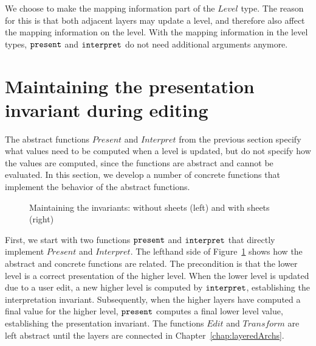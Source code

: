 

We choose to make the mapping information part of the $Level$ type. The reason for this is that both adjacent layers may update a level, and therefore also affect the mapping information on the level.  With the mapping information in the level types, ${\tt present}$ and ${\tt interpret}$ do not need additional arguments anymore.
\ec



%																
%																
%																
\section{Maintaining the presentation invariant during editing}   \label{sect:maintainingInv}

The abstract functions $Present$ and $Interpret$ from the previous section specify what values need to be computed when a level is updated, but do not specify how the values are computed, since the functions are abstract and cannot be evaluated. In this section, we develop a number of concrete  functions that implement the behavior of the abstract functions.

\begin{figure}
\begin{center}
\begin{center}
 
\end{center}
\caption{Maintaining the invariants: without sheets (left) and with sheets (right)}\label{maintainingInvs} 
\end{center}
\end{figure}

First, we start with two functions ${\tt present}$ and ${\tt interpret}$ that directly implement $Present$ and $Interpret$. The lefthand side of Figure~\ref{maintainingInvs} shows how the abstract and concrete functions are related. The precondition is that the lower level is a correct presentation of the higher level. When the lower level is updated due to a user edit, a new higher level is computed by ${\tt interpret}$, establishing the interpretation invariant. Subsequently, when the higher layers have computed a final value for the higher level, ${\tt present}$ computes a final lower level value, establishing the presentation invariant. The functions $Edit$ and $Transform$ are left abstract until the layers are connected in Chapter~\ref{chap:layeredArchs}.

